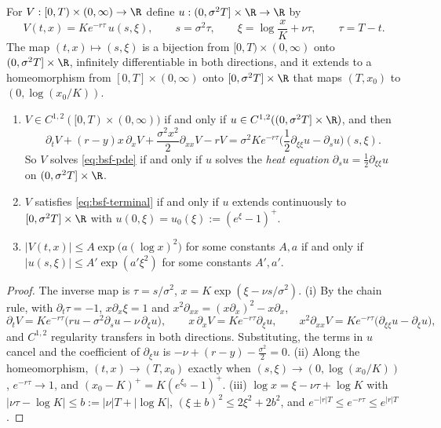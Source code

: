 \begin{lemma}\label{lem:bsf-heat}
For $V:[0,T)\times(0,\infty)\to\R$ define $u:(0,\sigma^2T]\times\R\to\R$ by
\begin{equation}\label{eq:bsf-change}
  V(t,x)=Ke^{-r\tau}\,u(s,\xi),\qquad s=\sigma^2\tau,\qquad \xi=\log\frac xK+\nu\tau,\qquad \tau=T-t .
\end{equation}
The map $(t,x)\mapsto(s,\xi)$ is a bijection from $[0,T)\times(0,\infty)$ onto $(0,\sigma^2T]\times\R$,
infinitely differentiable in both directions, and it extends to a homeomorphism from
$[0,T]\times(0,\infty)$ onto $[0,\sigma^2T]\times\R$ that maps $(T,x_0)$ to $(0,\log(x_0/K))$.
\begin{enumerate}[label=(\roman*)]
  \item $V\in C^{1,2}([0,T)\times(0,\infty))$ if and only if $u\in C^{1,2}((0,\sigma^2T]\times\R)$, and then
    \[
      \partial_tV+(r-y)x\,\partial_xV+\frac{\sigma^2x^2}{2}\partial_{xx}V-rV
      =\sigma^2Ke^{-r\tau}\Big(\frac12\partial_{\xi\xi}u-\partial_su\Big)(s,\xi) .
    \]
    So $V$ solves \eqref{eq:bsf-pde} if and only if $u$ solves the \emph{heat equation}
    $\partial_su=\frac12\partial_{\xi\xi}u$ on $(0,\sigma^2T]\times\R$.
  \item $V$ satisfies \eqref{eq:bsf-terminal} if and only if $u$ extends continuously to
    $[0,\sigma^2T]\times\R$ with $u(0,\xi)=u_0(\xi):=(e^\xi-1)^+$.
  \item $|V(t,x)|\le A\exp\big(a(\log x)^2\big)$ for some constants $A,a$ if and only if
    $|u(s,\xi)|\le A'\exp(a'\xi^2)$ for some constants $A',a'$.
\end{enumerate}
\end{lemma}

\begin{proof}
The inverse map is $\tau=s/\sigma^2$, $x=K\exp(\xi-\nu s/\sigma^2)$. (i) By the chain rule, with $\partial_t\tau=-1$, $x\partial_x\xi=1$ and
$x^2\partial_{xx}=(x\partial_x)^2-x\partial_x$,
\[
  \partial_tV=Ke^{-r\tau}\big(ru-\sigma^2\partial_su-\nu\,\partial_\xi u\big),\qquad
  x\,\partial_xV=Ke^{-r\tau}\partial_\xi u,\qquad x^2\partial_{xx}V=Ke^{-r\tau}\big(\partial_{\xi\xi}u-\partial_\xi u\big),
\]
and $C^{1,2}$ regularity transfers in both directions. Substituting, the terms in $u$ cancel and the
coefficient of $\partial_\xi u$ is $-\nu+(r-y)-\frac{\sigma^2}{2}=0$. (ii) Along the homeomorphism,
$(t,x)\to(T,x_0)$ exactly when $(s,\xi)\to(0,\log(x_0/K))$, $e^{-r\tau}\to1$, and
$(x_0-K)^+=K(e^{\xi_0}-1)^+$. (iii) $\log x=\xi-\nu\tau+\log K$ with $|\nu\tau-\log K|\le b:=|\nu|T+|\log K|$,
$(\xi\pm b)^2\le2\xi^2+2b^2$, and $e^{-|r|T}\le e^{-r\tau}\le e^{|r|T}$.
\end{proof}

